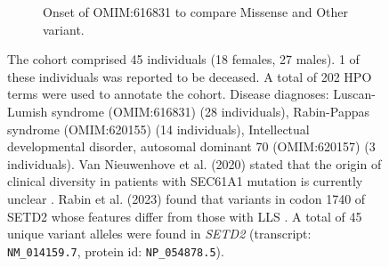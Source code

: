 \begin{figure}[htbp]
\begin{subfigure}[b]{0.95\textwidth}
\captionsetup{justification=raggedright,singlelinecheck=false}
\caption{Onset of OMIM:616831 to compare Missense and Other variant. }
\end{subfigure}

\caption{The cohort comprised 45 individuals (18 females, 27 males). 1 of these individuals was reported to be deceased. 
A total of 202 HPO terms were used to annotate the cohort. 
Disease diagnoses: Luscan-Lumish syndrome (OMIM:616831) (28 individuals), 
Rabin-Pappas syndrome (OMIM:620155) (14 individuals), 
Intellectual developmental disorder, autosomal dominant 70 (OMIM:620157) (3 individuals). 
Van Nieuwenhove et al. (2020) stated that 
the origin of clinical diversity in patients with SEC61A1 mutation is currently unclear \cite{PMID_32325141}. 
Rabin et al. (2023) found that variants in codon 1740 of SETD2 whose features differ from those with LLS \cite{PMID_32710489}.
A total of 45 unique variant alleles were found in \textit{SETD2} (transcript: \texttt{NM\_014159.7}, protein id: \texttt{NP\_054878.5}).}
\end{figure}
